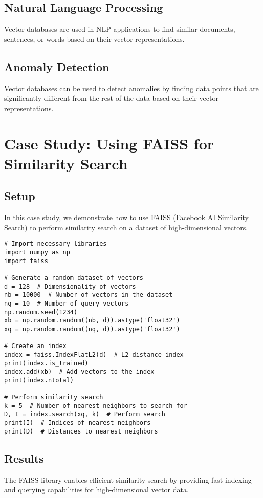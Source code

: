 \subsection{Natural Language Processing}
Vector databases are used in NLP applications to find similar documents, sentences, or words based on their vector representations.

\subsection{Anomaly Detection}
Vector databases can be used to detect anomalies by finding data points that are significantly different from the rest of the data based on their vector representations.

\section{Case Study: Using FAISS for Similarity Search}

\subsection{Setup}
In this case study, we demonstrate how to use FAISS (Facebook AI Similarity Search) to perform similarity search on a dataset of high-dimensional vectors.

\begin{verbatim}
# Import necessary libraries
import numpy as np
import faiss

# Generate a random dataset of vectors
d = 128  # Dimensionality of vectors
nb = 10000  # Number of vectors in the dataset
nq = 10  # Number of query vectors
np.random.seed(1234)
xb = np.random.random((nb, d)).astype('float32')
xq = np.random.random((nq, d)).astype('float32')

# Create an index
index = faiss.IndexFlatL2(d)  # L2 distance index
print(index.is_trained)
index.add(xb)  # Add vectors to the index
print(index.ntotal)

# Perform similarity search
k = 5  # Number of nearest neighbors to search for
D, I = index.search(xq, k)  # Perform search
print(I)  # Indices of nearest neighbors
print(D)  # Distances to nearest neighbors
\end{verbatim}

\subsection{Results}
The FAISS library enables efficient similarity search by providing fast indexing and querying capabilities for high-dimensional vector data.

